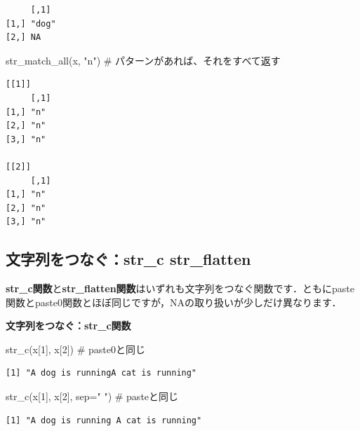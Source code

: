 \documentclass[
  letterpaper,
  DIV=11,
  numbers=noendperiod]{scrreprt}
\newenvironment{Shaded}{\begin{snugshade}}{\end{snugshade}}
\newcommand{\AttributeTok}[1]{\textcolor[rgb]{0.40,0.45,0.13}{#1}}
\newcommand{\CommentTok}[1]{\textcolor[rgb]{0.37,0.37,0.37}{#1}}
\newcommand{\DecValTok}[1]{\textcolor[rgb]{0.68,0.00,0.00}{#1}}
\newcommand{\FunctionTok}[1]{\textcolor[rgb]{0.28,0.35,0.67}{#1}}
\newcommand{\NormalTok}[1]{\textcolor[rgb]{0.00,0.23,0.31}{#1}}
\newcommand{\StringTok}[1]{\textcolor[rgb]{0.13,0.47,0.30}{#1}}
\begin{document}
\begin{verbatim}
     [,1] 
[1,] "dog"
[2,] NA   
\end{verbatim}

\begin{Shaded}
\begin{Highlighting}[]
\FunctionTok{str\_match\_all}\NormalTok{(x, }\StringTok{"n"}\NormalTok{) }\CommentTok{\# パターンがあれば、それをすべて返す}
\end{Highlighting}
\end{Shaded}

\begin{verbatim}
[[1]]
     [,1]
[1,] "n" 
[2,] "n" 
[3,] "n" 

[[2]]
     [,1]
[1,] "n" 
[2,] "n" 
[3,] "n" 
\end{verbatim}

\hypertarget{ux6587ux5b57ux5217ux3092ux3064ux306aux3050str_c-str_flatten}{%
\subsection{文字列をつなぐ：str\_c
str\_flatten}\label{ux6587ux5b57ux5217ux3092ux3064ux306aux3050str_c-str_flatten}}

\textbf{str\_c関数}と\textbf{str\_flatten関数}はいずれも文字列をつなぐ関数です．ともにpaste関数とpaste0関数とほぼ同じですが，NAの取り扱いが少しだけ異なります．

\textbf{文字列をつなぐ：str\_c関数}

\begin{Shaded}
\begin{Highlighting}[]
\FunctionTok{str\_c}\NormalTok{(x[}\DecValTok{1}\NormalTok{], x[}\DecValTok{2}\NormalTok{]) }\CommentTok{\# paste0と同じ}
\end{Highlighting}
\end{Shaded}

\begin{verbatim}
[1] "A dog is runningA cat is running"
\end{verbatim}

\begin{Shaded}
\begin{Highlighting}[]
\FunctionTok{str\_c}\NormalTok{(x[}\DecValTok{1}\NormalTok{], x[}\DecValTok{2}\NormalTok{], }\AttributeTok{sep=}\StringTok{" "}\NormalTok{) }\CommentTok{\# pasteと同じ}
\end{Highlighting}
\end{Shaded}

\begin{verbatim}
[1] "A dog is running A cat is running"
\end{verbatim}
\end{document}

